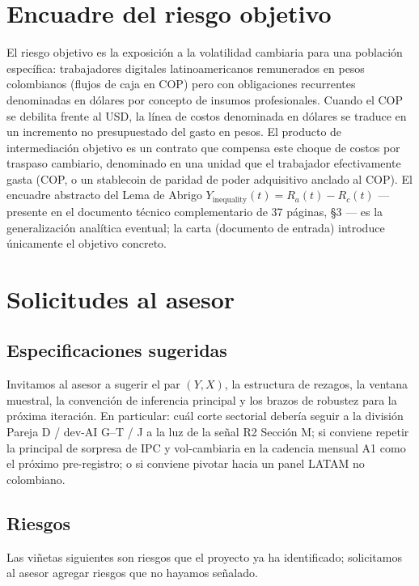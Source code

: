 \documentclass[11pt,a4paper]{article}
\theoremstyle{plain}
\begin{document}
\section{Encuadre del riesgo objetivo}\label{sec:3}

El riesgo objetivo es la exposición a la volatilidad cambiaria para una población específica: trabajadores digitales latinoamericanos remunerados en pesos colombianos (flujos de caja en COP) pero con obligaciones recurrentes denominadas en dólares por concepto de insumos profesionales. Cuando el COP se debilita frente al USD, la línea de costos denominada en dólares se traduce en un incremento no presupuestado del gasto en pesos. El producto de intermediación objetivo es un contrato que compensa este choque de costos por traspaso cambiario, denominado en una unidad que el trabajador efectivamente gasta (COP, o un stablecoin de paridad de poder adquisitivo anclado al COP). El encuadre abstracto del Lema de Abrigo \(Y_{\mathrm{inequality}}(t) = R_a(t) - R_c(t)\) --- presente en el documento técnico complementario de 37 páginas, \S3 --- es la generalización analítica eventual; la carta (documento de entrada) introduce únicamente el objetivo concreto.

\section{Solicitudes al asesor}\label{sec:4}

\subsection{Especificaciones sugeridas}\label{sec:4-specs}

Invitamos al asesor a sugerir el par \((Y, X)\), la estructura de rezagos, la ventana muestral, la convención de inferencia principal y los brazos de robustez para la próxima iteración. En particular: cuál corte sectorial debería seguir a la división Pareja D / dev-AI G--T / J a la luz de la señal R2 Sección M; si conviene repetir la principal de sorpresa de IPC y vol-cambiaria en la cadencia mensual A1 como el próximo pre-registro; o si conviene pivotar hacia un panel LATAM no colombiano.

\subsection{Riesgos}\label{sec:4-risks}

Las viñetas siguientes son riesgos que el proyecto ya ha identificado; solicitamos al asesor agregar riesgos que no hayamos señalado.
\end{document}
